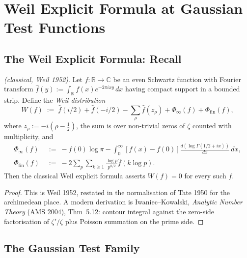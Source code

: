 \section{Weil Explicit Formula at Gaussian Test Functions}
\label{v4-arith:w5-i:weil-gaussians}

\subsection{The Weil Explicit Formula: Recall}
\label{v4-arith:w5-i:weil-recall}

\begin{lemma}
\label{v4-arith:w5-i:lem:weil}
\ClaimStatusDefinitional \emph{(classical, Weil 1952)}. Let
\(f:\mathbb{R}\to\mathbb{C}\) be an even Schwartz function with Fourier
transform \(\widehat{f}(y):=\int_{\mathbb{R}}f(x)e^{-2\pi ixy}\,dx\)
having compact support in a bounded strip. Define the \emph{Weil
distribution}
\begin{equation}
\label{v4-arith:w5-i:eq:weil-def}
W(f)\;:=\;\widehat{f}(i/2)+\widehat{f}(-i/2)-\sum_{\rho}\widehat{f}(z_{\rho})+
\Phi_{\infty}(f)+\Phi_{\mathrm{fin}}(f),
\end{equation}
where \(z_{\rho}:=-i(\rho-\tfrac12)\), the sum is over non-trivial
zeros of \(\zeta\) counted with multiplicity, and
\begin{align}
\Phi_{\infty}(f)
&\;:=\;-f(0)\log\pi-\int_{0}^{\infty}\left[f(x)-f(0)\right]\frac{d(\log\Gamma(1/2+ix))}{dx}\,dx,\label{v4-arith:w5-i:eq:phi-arch}\\
\Phi_{\mathrm{fin}}(f)
&\;:=\;-2\sum_{p}\sum_{k\geq 1}\frac{\log p}{p^{k/2}}\widehat{f}(k\log p).\label{v4-arith:w5-i:eq:phi-fin}
\end{align}
Then the classical Weil explicit formula asserts \(W(f)=0\) for every
such \(f\).
\end{lemma}

\begin{proof}
This is Weil 1952, restated in the normalisation of Tate 1950 for the
archimedean place. A modern derivation is Iwaniec--Kowalski,
\emph{Analytic Number Theory} (AMS 2004), Thm~5.12: contour integral
against the zero-side factorisation of \(\zeta'/\zeta\) plus Poisson
summation on the prime side.
\end{proof}

\subsection{The Gaussian Test Family}
\label{v4-arith:w5-i:gauss-family}

